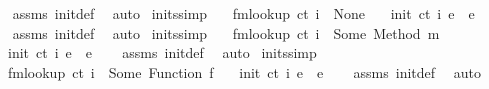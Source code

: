 \begin{isabellebody}
\ \ %
\endisadelimproof
%
\isatagproof
{}\isamarkupfalse%
\ assms\ init{\isacharunderscore}{\kern0pt}def\ \isamarkupfalse%
\ auto%
\endisatagproof
{\isafoldproof}%
%
\isadelimproof
\isanewline
%
\endisadelimproof
\isanewline
{}\isamarkupfalse%
\ init{\isacharunderscore}{\kern0pt}s{}{}{\isacharbrackleft}{\kern0pt}simp{\isacharbrackright}{\kern0pt}{\isacharcolon}{\kern0pt}\isanewline
\ \ \ {\isachardoublequoteopen}fmlookup\ ct\ i\ {\isacharequal}{\kern0pt}\ None{\isachardoublequoteclose}\isanewline
\ \ \ {\isachardoublequoteopen}init\ ct\ i\ e\ {\isacharequal}{\kern0pt}\ e{\isachardoublequoteclose}\isanewline
%
\isadelimproof
\ \ %
\endisadelimproof
%
\isatagproof
{}\isamarkupfalse%
\ assms\ init{\isacharunderscore}{\kern0pt}def\ \isamarkupfalse%
\ auto%
\endisatagproof
{\isafoldproof}%
%
\isadelimproof
\isanewline
%
\endisadelimproof
\isanewline
{}\isamarkupfalse%
\ init{\isacharunderscore}{\kern0pt}s{}{}{\isacharbrackleft}{\kern0pt}simp{\isacharbrackright}{\kern0pt}{\isacharcolon}{\kern0pt}\isanewline
\ \ \ {\isachardoublequoteopen}fmlookup\ ct\ i\ {\isacharequal}{\kern0pt}\ Some\ {\isacharparenleft}{\kern0pt}Method\ m{\isacharparenright}{\kern0pt}{\isachardoublequoteclose}\isanewline
\ \ \ {\isachardoublequoteopen}init\ ct\ i\ e\ {\isacharequal}{\kern0pt}\ e{\isachardoublequoteclose}\isanewline
%
\isadelimproof
\ \ %
\endisadelimproof
%
\isatagproof
{}\isamarkupfalse%
\ assms\ init{\isacharunderscore}{\kern0pt}def\ \isamarkupfalse%
\ auto%
\endisatagproof
{\isafoldproof}%
%
\isadelimproof
\isanewline
%
\endisadelimproof
\isanewline
{}\isamarkupfalse%
\ init{\isacharunderscore}{\kern0pt}s{}{}{\isacharbrackleft}{\kern0pt}simp{\isacharbrackright}{\kern0pt}{\isacharcolon}{\kern0pt}\isanewline
\ \ \ {\isachardoublequoteopen}fmlookup\ ct\ i\ {\isacharequal}{\kern0pt}\ Some\ {\isacharparenleft}{\kern0pt}Function\ f{\isacharparenright}{\kern0pt}{\isachardoublequoteclose}\isanewline
\ \ \ {\isachardoublequoteopen}init\ ct\ i\ e\ {\isacharequal}{\kern0pt}\ e{\isachardoublequoteclose}\isanewline
%
\isadelimproof
\ \ %
\endisadelimproof
%
\isatagproof
{}\isamarkupfalse%
\ assms\ init{\isacharunderscore}{\kern0pt}def\ \isamarkupfalse%
\ auto%
\endisatagproof
{\isafoldproof}%
%
\isadelimproof
\isanewline
%
\endisadelimproof

\end{isabellebody}

